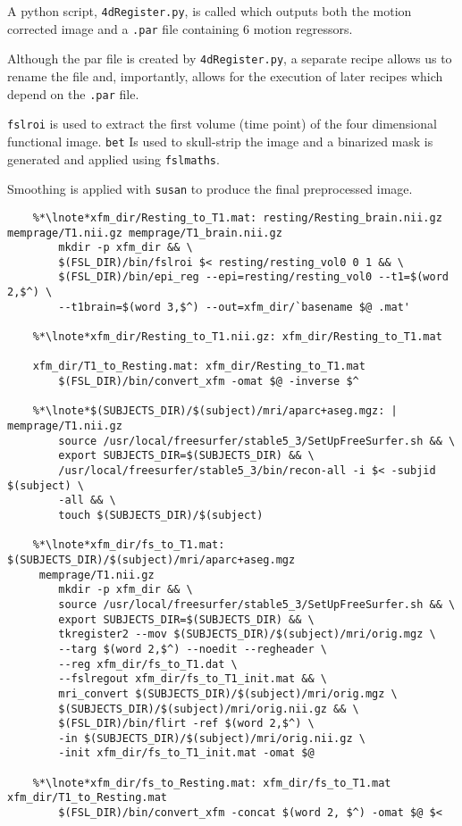 A python script, \texttt{4dRegister.py}, is called which outputs both the motion corrected image and a \texttt{.par} file containing 6 motion regressors.

Although the par file is created by \texttt{4dRegister.py}, a separate recipe allows us to rename the file and, importantly, allows for the execution of later recipes which depend on the \texttt{.par} file.

\texttt{fslroi} is used to extract the first volume (time point) of the four dimensional functional image. \texttt{bet} Is used to skull-strip the image and a binarized mask is generated and applied using \texttt{fslmaths}.

Smoothing is applied with \texttt{susan} to produce the final preprocessed image.

\begin{lstlisting}
	%*\lnote*xfm_dir/Resting_to_T1.mat: resting/Resting_brain.nii.gz memprage/T1.nii.gz memprage/T1_brain.nii.gz
		mkdir -p xfm_dir && \
		$(FSL_DIR)/bin/fslroi $< resting/resting_vol0 0 1 && \
		$(FSL_DIR)/bin/epi_reg --epi=resting/resting_vol0 --t1=$(word 2,$^) \
		--t1brain=$(word 3,$^) --out=xfm_dir/`basename $@ .mat'
	
	%*\lnote*xfm_dir/Resting_to_T1.nii.gz: xfm_dir/Resting_to_T1.mat
	
	xfm_dir/T1_to_Resting.mat: xfm_dir/Resting_to_T1.mat
		$(FSL_DIR)/bin/convert_xfm -omat $@ -inverse $^
	
	%*\lnote*$(SUBJECTS_DIR)/$(subject)/mri/aparc+aseg.mgz: | memprage/T1.nii.gz
		source /usr/local/freesurfer/stable5_3/SetUpFreeSurfer.sh && \
		export SUBJECTS_DIR=$(SUBJECTS_DIR) && \
		/usr/local/freesurfer/stable5_3/bin/recon-all -i $< -subjid $(subject) \
		-all && \
		touch $(SUBJECTS_DIR)/$(subject)
	
	%*\lnote*xfm_dir/fs_to_T1.mat: $(SUBJECTS_DIR)/$(subject)/mri/aparc+aseg.mgz
	 memprage/T1.nii.gz
		mkdir -p xfm_dir && \
		source /usr/local/freesurfer/stable5_3/SetUpFreeSurfer.sh && \
		export SUBJECTS_DIR=$(SUBJECTS_DIR) && \
		tkregister2 --mov $(SUBJECTS_DIR)/$(subject)/mri/orig.mgz \
		--targ $(word 2,$^) --noedit --regheader \
		--reg xfm_dir/fs_to_T1.dat \
		--fslregout xfm_dir/fs_to_T1_init.mat && \
		mri_convert $(SUBJECTS_DIR)/$(subject)/mri/orig.mgz \
		$(SUBJECTS_DIR)/$(subject)/mri/orig.nii.gz && \
		$(FSL_DIR)/bin/flirt -ref $(word 2,$^) \
		-in $(SUBJECTS_DIR)/$(subject)/mri/orig.nii.gz \
		-init xfm_dir/fs_to_T1_init.mat -omat $@
	
	%*\lnote*xfm_dir/fs_to_Resting.mat: xfm_dir/fs_to_T1.mat xfm_dir/T1_to_Resting.mat
		$(FSL_DIR)/bin/convert_xfm -concat $(word 2, $^) -omat $@ $<
\end{lstlisting}

